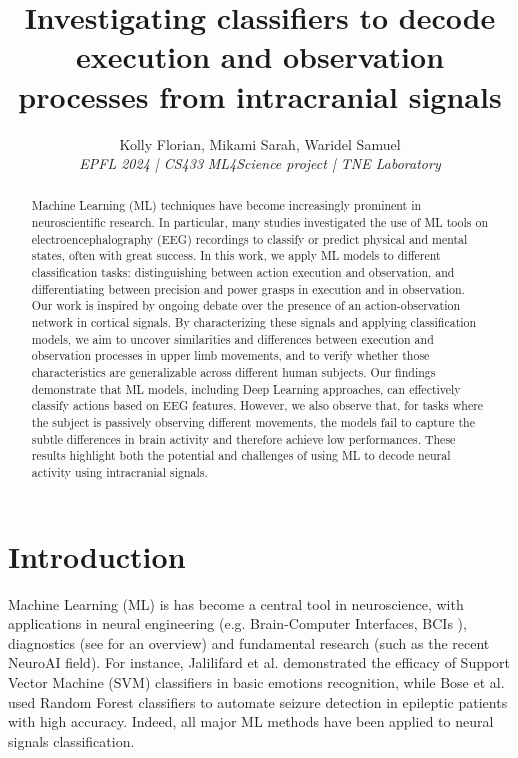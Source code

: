 \documentclass[10pt,conference,compsocconf]{IEEEtran}
\begin{document}
\title{Investigating classifiers to decode execution and observation processes from intracranial signals}

\author{
  Kolly Florian, Mikami Sarah, Waridel Samuel \\
  \textit{EPFL 2024 | CS433}
  \textit{ML4Science project | TNE Laboratory}
}

\maketitle

\begin{abstract}
    Machine Learning (ML) techniques have become increasingly prominent in neuroscientific research. In particular, many studies investigated the use of ML tools on electroencephalography (EEG) recordings to classify or predict physical and mental states, often with great success. In this work, we apply ML models to different classification tasks: distinguishing between action execution and observation, and differentiating between precision and power grasps in execution and in observation. Our work is inspired by ongoing debate over the presence of an action-observation network in cortical signals. By characterizing these signals and applying classification models, we aim to uncover similarities and differences between execution and observation processes in upper limb movements, and to verify whether those characteristics are generalizable across different human subjects. Our findings demonstrate that ML models, including Deep Learning approaches, can effectively classify actions based on EEG features. However, we also observe that, for tasks where the subject is passively observing different movements, the models fail to capture the subtle differences in brain activity and therefore achieve low performances. These results highlight both the potential and challenges of using ML to decode neural activity using intracranial signals.
\end{abstract}

\section{Introduction}
Machine Learning (ML) is has become a central tool in neuroscience, with applications in neural engineering (e.g. Brain-Computer Interfaces, BCIs \cite{eegforbci}), diagnostics (see \cite{VIEIRA201758} for an overview) and fundamental research (such as the recent NeuroAI field). For instance, Jalilifard et al. \cite{EmotionClassificationSVM} demonstrated the efficacy of Support Vector Machine (SVM) classifiers in basic emotions recognition, while Bose et al. \cite{EEGRandomForset} used Random Forest classifiers to automate seizure detection in epileptic patients with high accuracy. Indeed, all major ML methods have been applied to neural signals classification\cite{EEGMLReview}.
\end{document}
